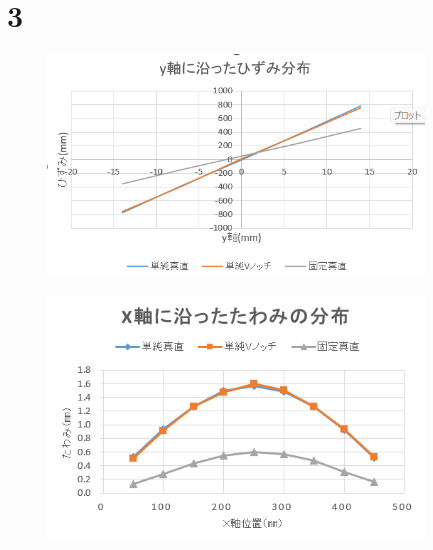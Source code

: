 \documentclass[pdflatex,ja=standard,fleqn]{bxjsarticle}
\begin{document}
\section*{3}
\begin{figure}[htbp]
    \centering
    \includegraphics[width=10cm]{hizumi2.png}
\end{figure}
\begin{figure}[htbp]
    \centering
    \includegraphics[width=10cm]{tawami7.png}
\end{figure}
\end{document}
